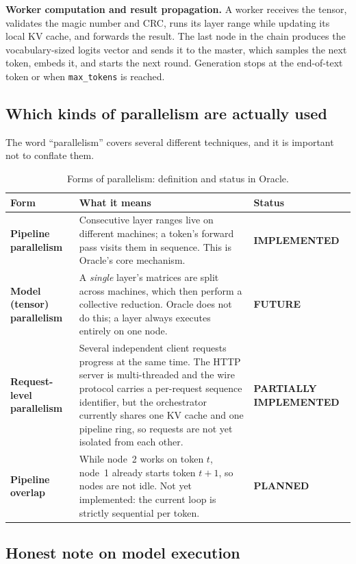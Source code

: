 \documentclass[11pt,a4paper]{article}
\newcommand{\stImp}{\textcolor{ogreen}{\footnotesize\textsf{\textbf{IMPLEMENTED}}}}
\newcommand{\stPart}{\textcolor{oamber}{\footnotesize\textsf{\textbf{PARTIALLY IMPLEMENTED}}}}
\newcommand{\stPlan}{\textcolor{oblue}{\footnotesize\textsf{\textbf{PLANNED}}}}
\newcommand{\stFut}{\textcolor{ored}{\footnotesize\textsf{\textbf{FUTURE}}}}
\begin{document}
\textbf{Worker computation and result propagation.} A worker receives the tensor,
validates the magic number and CRC, runs its layer range while updating its local
KV cache, and forwards the result. The last node in the chain produces the
vocabulary-sized logits vector and sends it to the master, which samples the next
token, embeds it, and starts the next round. Generation stops at the end-of-text
token or when \texttt{max\_tokens} is reached.

\subsection{Which kinds of parallelism are actually used}

The word ``parallelism'' covers several different techniques, and it is important
not to conflate them.

\begin{table}[h]
\centering
\caption{Forms of parallelism: definition and status in Oracle.}
\label{tab:parallel}
\footnotesize
\begin{tabularx}{\textwidth}{@{}l X l@{}}
\toprule
\textbf{Form} & \textbf{What it means} & \textbf{Status} \\
\midrule
\textbf{Pipeline parallelism} &
  Consecutive layer ranges live on different machines; a token's forward pass
  visits them in sequence. This is Oracle's core mechanism. & \stImp \\
\textbf{Model (tensor) parallelism} &
  A \emph{single} layer's matrices are split across machines, which then perform
  a collective reduction. Oracle does not do this; a layer always executes
  entirely on one node. & \stFut \\
\textbf{Request-level parallelism} &
  Several independent client requests progress at the same time. The HTTP server
  is multi-threaded and the wire protocol carries a per-request sequence
  identifier, but the orchestrator currently shares one KV cache and one pipeline
  ring, so requests are not yet isolated from each other. & \stPart \\
\textbf{Pipeline overlap} &
  While node~2 works on token $t$, node~1 already starts token $t{+}1$, so nodes
  are not idle. Not yet implemented: the current loop is strictly sequential per
  token. & \stPlan \\
\bottomrule
\end{tabularx}
\end{table}

\subsection{Honest note on model execution}
\end{document}
